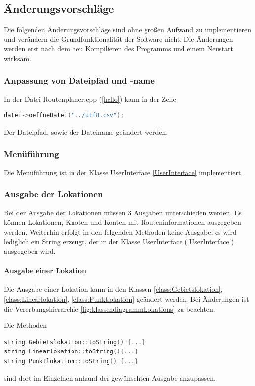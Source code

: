 \documentclass[12pt, a4paper, ngerman]{article}
\begin{document}
\subsection{Änderungsvorschläge}
Die folgenden Änderungsvorschläge sind ohne großen Aufwand zu implementieren und verändern die Grundfunktionalität der Software nicht. Die  Änderungen werden erst nach dem neu Kompilieren des Programms und einem Neustart wirksam. 

\subsubsection{Anpassung von Dateipfad und -name}
In der Datei Routenplaner.cpp (\ref{hello}) kann in der Zeile 
\begin{lstlisting}[language=C++]
datei->oeffneDatei("../utf8.csv");
\end{lstlisting}
Der Dateipfad, sowie der Dateiname geändert werden.

\subsubsection{Menüführung}
Die Menüführung ist in der Klasse UserInterface \ref{UserInterface} implementiert. 

\subsubsection{Ausgabe der Lokationen}
Bei der Ausgabe der Lokationen müssen 3 Ausgaben unterschieden werden. Es können Lokationen, Knoten und Konten mit Routeninformationen ausgegeben werden. Weiterhin erfolgt in den folgenden Methoden keine Ausgabe, es wird lediglich ein String erzeugt, der in der Klasse UserInterface (\ref{UserInterface}) ausgegeben wird.
\paragraph{Ausgabe einer Lokation}
Die Ausgabe einer Lokation kann in den Klassen \ref{class:Gebietslokation}, \ref{class:Linearlokation}, \ref{class:Punktlokation} geändert werden. Bei Änderungen ist die Vererbungshierarchie \ref{fig:klassendiagrammLokations} zu beachten. 

Die Methoden 
\begin{lstlisting}[language=C++]
string Gebietslokation::toString() {...}
string Linearlokation::toString(){...}
string Punktlokation::toString() {...}
\end{lstlisting}
sind dort im Einzelnen anhand der gewünschten Ausgabe anzupassen.
\end{document}
